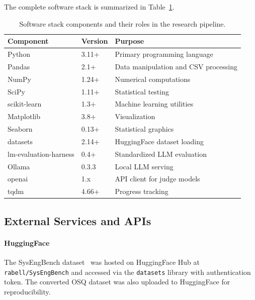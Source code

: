 The complete software stack is summarized in Table~\ref{tab:software_stack}.

\begin{table}[htbp]
    \centering
    \caption{Software stack components and their roles in the research pipeline.}
    \label{tab:software_stack}
    \begin{tabular}{lll}
        \toprule
        \textbf{Component} & \textbf{Version} & \textbf{Purpose} \\
        \midrule
        Python & 3.11+ & Primary programming language \\
        Pandas & 2.1+ & Data manipulation and CSV processing \\
        NumPy & 1.24+ & Numerical computations \\
        SciPy & 1.11+ & Statistical testing \\
        scikit-learn & 1.3+ & Machine learning utilities \\
        Matplotlib & 3.8+ & Visualization \\
        Seaborn & 0.13+ & Statistical graphics \\
        datasets & 2.14+ & HuggingFace dataset loading \\
        lm-evaluation-harness & 0.4+ & Standardized LLM evaluation \\
        Ollama & 0.3.3 & Local LLM serving \\
        openai & 1.x & API client for judge models \\
        tqdm & 4.66+ & Progress tracking \\
        \bottomrule
    \end{tabular}
\end{table}

\subsection{External Services and APIs}

\paragraph{HuggingFace} The SysEngBench dataset~\citep{sysengbench_citation} was hosted on HuggingFace Hub at \texttt{rabell/SysEngBench} and accessed via the \texttt{datasets} library with authentication token. The converted OSQ dataset was also uploaded to HuggingFace for reproducibility.

